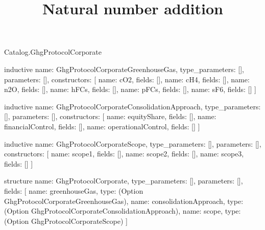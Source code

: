 \begin{lexlean}{Catalog.GhgProtocolCorporate}
\title{Natural number addition}
\begin{semanticmodule}
inductive{
  name: GhgProtocolCorporateGreenhouseGas,
  type_parameters: [],
  parameters: [],
  constructors: [
    {name: cO2, fields: []},
    {name: cH4, fields: []},
    {name: n2O, fields: []},
    {name: hFCs, fields: []},
    {name: pFCs, fields: []},
    {name: sF6, fields: []}
  ]
}

inductive{
  name: GhgProtocolCorporateConsolidationApproach,
  type_parameters: [],
  parameters: [],
  constructors: [
    {name: equityShare, fields: []},
    {name: financialControl, fields: []},
    {name: operationalControl, fields: []}
  ]
}

inductive{
  name: GhgProtocolCorporateScope,
  type_parameters: [],
  parameters: [],
  constructors: [
    {name: scope1, fields: []},
    {name: scope2, fields: []},
    {name: scope3, fields: []}
  ]
}

structure{
  name: GhgProtocolCorporate,
  type_parameters: [],
  parameters: [],
  fields: [
    {name: greenhouseGas, type: (Option GhgProtocolCorporateGreenhouseGas)},
    {name: consolidationApproach, type: (Option GhgProtocolCorporateConsolidationApproach)},
    {name: scope, type: (Option GhgProtocolCorporateScope)}
  ]
}
\end{semanticmodule}
\end{lexlean}

